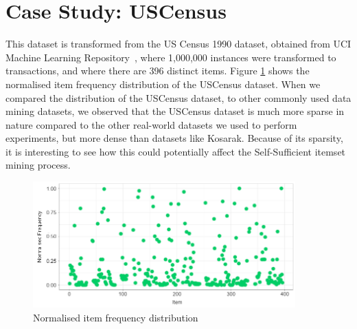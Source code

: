 \begin{table}[h!]
\caption{Gradual Drift Detection}
\label{tb:gradual}
\begin{center}
\end{center}
\end{table}

\section{Case Study: USCensus}

This dataset is transformed from the US Census 1990 dataset, obtained from UCI Machine Learning Repository~\cite{uci1,uci2}, where 1,000,000 instances were transformed to transactions, and where there are 396 distinct items. Figure \ref{fig:frequs} shows the normalised item frequency distribution of the USCensus dataset. When we compared the distribution of the USCensus dataset, to other commonly used data mining datasets, we observed that the USCensus dataset is much more sparse in nature compared to the other real-world datasets we used to perform experiments, but more dense than datasets like Kosarak. Because of its sparsity, it is interesting to see how this could potentially affect the Self-Sufficient itemset mining process. 

\begin{figure}[H]
    \centering
    \includegraphics[width=0.9\textwidth]{Experiments/Frequencynor.png}
    \caption{Normalised item frequency distribution}
    \label{fig:frequs}
\end{figure}

